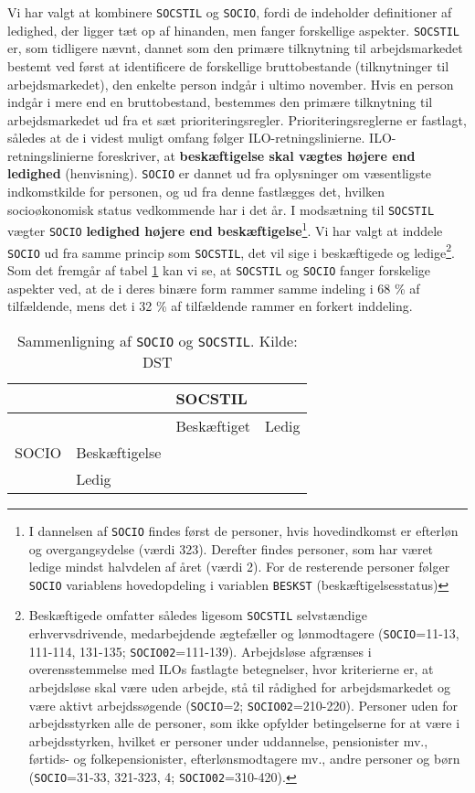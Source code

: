Vi har valgt at kombinere \texttt{SOCSTIL} og \texttt{SOCIO}, fordi de indeholder definitioner af ledighed, der ligger tæt op af hinanden, men fanger forskellige aspekter. \texttt{SOCSTIL} er, som tidligere nævnt, dannet som den primære tilknytning til arbejdsmarkedet bestemt ved først at identificere de forskellige bruttobestande (tilknytninger til arbejdsmarkedet), den enkelte person indgår i ultimo november. Hvis en person indgår i mere end en bruttobestand, bestemmes den primære tilknytning til arbejdsmarkedet ud fra et sæt prioriteringsregler. Prioriteringsreglerne er fastlagt, således at de i videst muligt omfang følger ILO-retningslinierne. ILO-retningslinierne foreskriver, at \textbf{beskæftigelse skal vægtes højere end ledighed} (henvisning). \texttt{SOCIO} er dannet ud fra oplysninger om væsentligste indkomstkilde for personen, og ud fra denne fastlægges det, hvilken socioøkonomisk status vedkommende har i det år. I modsætning til \texttt{SOCSTIL} vægter \texttt{SOCIO} \textbf{ledighed højere end beskæftigelse}\footnote{I dannelsen af \texttt{SOCIO} findes først de personer, hvis hovedindkomst er efterløn og overgangsydelse (værdi 323). Derefter findes personer, som har været ledige mindst halvdelen af året (værdi 2). For de resterende personer følger \texttt{SOCIO} variablens hovedopdeling i variablen \texttt{BESKST} (beskæftigelsesstatus)}. Vi har valgt at inddele \texttt{SOCIO} ud fra samme princip som \texttt{SOCSTIL}, det vil sige i beskæftigede og ledige\footnote{Beskæftigede omfatter således ligesom \texttt{SOCSTIL} selvstændige erhvervsdrivende, medarbejdende ægtefæller og lønmodtagere (\texttt{SOCIO}=11-13, 111-114, 131-135; \texttt{SOCIO02}=111-139). Arbejdsløse afgrænses i overensstemmelse med ILOs fastlagte betegnelser, hvor kriterierne er, at arbejdsløse skal  være uden arbejde, stå til rådighed for arbejdsmarkedet og være aktivt arbejdssøgende (\texttt{SOCIO}=2; \texttt{SOCIO02}=210-220). Personer uden for arbejdsstyrken alle de personer, som ikke opfylder betingelserne for at være i arbejdsstyrken, hvilket er personer under uddannelse, pensionister mv., førtids- og folkepensionister, efterlønsmodtagere mv., andre personer og børn (\texttt{SOCIO}=31-33, 321-323, 4; \texttt{SOCIO02}=310-420).}. Som det fremgår af tabel \ref{tab_SOCIO_SOCSTIL_sammenligning} kan vi se, at \texttt{SOCSTIL} og \texttt{SOCIO} fanger forskelige aspekter ved, at de i deres binære form rammer samme indeling i 68 \% af tilfældende, mens det i 32 \% af tilfældende rammer en forkert inddeling.
% 
\begin{table}[H] \centering
\caption{Sammenligning af \texttt{SOCIO} og \texttt{SOCSTIL}. Kilde: DST}
\label{tab_SOCIO_SOCSTIL_sammenligning}
\begin{tabular}{@{}llll@{}} \toprule
 & & SOCSTIL &  \\ \midrule
 & & Beskæftiget & Ledig \\ 
 SOCIO & Beskæftigelse & & \\ 
 & Ledig & & \\  \bottomrule
\end{tabular} \end{table}
